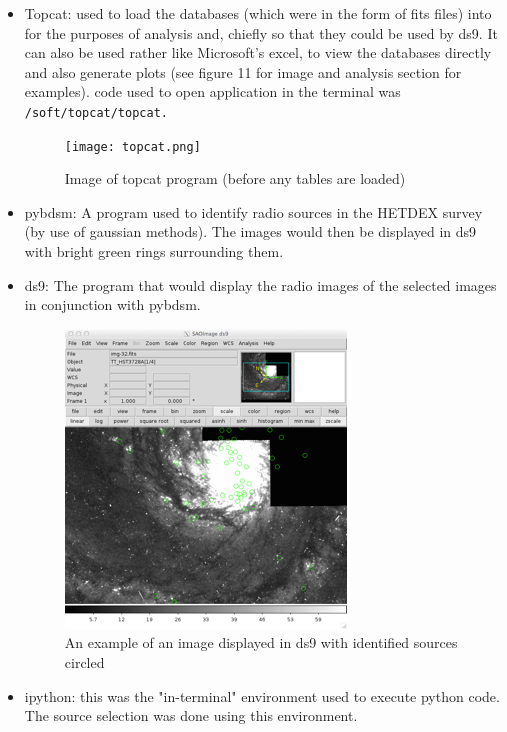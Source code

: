 \documentclass{article}
\begin{document}
\begin{itemize}
    \item Topcat: used to load the databases (which were in the form of fits files) into for the purposes of analysis and, chiefly so that they could be used by ds9. It can also be used rather like Microsoft's excel, to view the databases directly and also generate plots (see figure 11 for image and analysis section for examples). code used to open application in the terminal was \texttt{/soft/topcat/topcat.}
    
    \begin{figure}
        \centering
        \texttt{[image: topcat.png]}
        \caption{Image of topcat program (before any tables are loaded)}
    \end{figure}
    
    \item pybdsm: A program used to identify radio sources in the HETDEX survey (by use of gaussian methods). The images would then be displayed in ds9 with bright green rings surrounding them.
    
    \item ds9: The program that would display the radio images of the selected images in conjunction with pybdsm.
    
    \begin{figure}
        \centering
        \includegraphics{ds9.png}
        \caption{An example of an image displayed in ds9 with identified sources circled}
    \end{figure}
    
    \item ipython: this was the "in-terminal" environment used to execute python code. The source selection was done using this environment.
    

\end{itemize}
\end{document}

